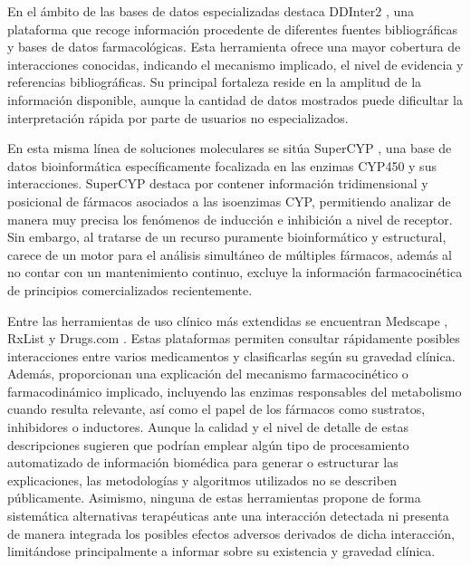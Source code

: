 En el ámbito de las bases de datos especializadas destaca DDInter2 \cite{ddinter_database}, una plataforma que recoge información procedente de diferentes fuentes bibliográficas y bases de datos farmacológicas. Esta herramienta ofrece una mayor cobertura de interacciones conocidas, indicando el mecanismo implicado, el nivel de evidencia y referencias bibliográficas. Su principal fortaleza reside en la amplitud de la información disponible, aunque la cantidad de datos mostrados puede dificultar la interpretación rápida por parte de usuarios no especializados.

En esta misma línea de soluciones moleculares se sitúa SuperCYP \cite{supercyp}, una base de datos bioinformática específicamente focalizada en las enzimas CYP450 y sus interacciones. SuperCYP destaca por contener información tridimensional y posicional de fármacos asociados a las isoenzimas CYP, permitiendo analizar de manera muy precisa los fenómenos de inducción e inhibición a nivel de receptor. Sin embargo, al tratarse de un recurso puramente bioinformático y estructural, carece de un motor para el análisis simultáneo de múltiples fármacos, además al no contar con un mantenimiento continuo, excluye la información farmacocinética de principios comercializados recientemente.

Entre las herramientas de uso clínico más extendidas se encuentran Medscape \cite{medscape_checker}, RxList \cite{rxlist_checker} y Drugs.com \cite{drugs_checker}. Estas plataformas permiten consultar rápidamente posibles interacciones entre varios medicamentos y clasificarlas según su gravedad clínica. Además, proporcionan una explicación del mecanismo farmacocinético o farmacodinámico implicado, incluyendo las enzimas responsables del metabolismo cuando resulta relevante, así como el papel de los fármacos como sustratos, inhibidores o inductores. Aunque la calidad y el nivel de detalle de estas descripciones sugieren que podrían emplear algún tipo de procesamiento automatizado de información biomédica para generar o estructurar las explicaciones, las metodologías y algoritmos utilizados no se describen públicamente. Asimismo, ninguna de estas herramientas propone de forma sistemática alternativas terapéuticas ante una interacción detectada ni presenta de manera integrada los posibles efectos adversos derivados de dicha interacción, limitándose principalmente a informar sobre su existencia y gravedad clínica.
